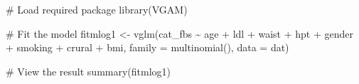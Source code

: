 \documentclass[
  letterpaper,
  DIV=11,
  numbers=noendperiod]{scrartcl}
\newenvironment{Shaded}{\begin{snugshade}}{\end{snugshade}}
\newcommand{\AttributeTok}[1]{\textcolor[rgb]{0.40,0.45,0.13}{#1}}
\newcommand{\CommentTok}[1]{\textcolor[rgb]{0.37,0.37,0.37}{#1}}
\newcommand{\FunctionTok}[1]{\textcolor[rgb]{0.28,0.35,0.67}{#1}}
\newcommand{\NormalTok}[1]{\textcolor[rgb]{0.00,0.23,0.31}{#1}}
\newcommand{\OtherTok}[1]{\textcolor[rgb]{0.00,0.23,0.31}{#1}}
\newcommand{\SpecialCharTok}[1]{\textcolor[rgb]{0.37,0.37,0.37}{#1}}
\begin{document}
\begin{Shaded}
\begin{Highlighting}[]
\CommentTok{\# Load required package}
\FunctionTok{library}\NormalTok{(VGAM)}

\CommentTok{\# Fit the model}
\NormalTok{fitmlog1 }\OtherTok{\textless{}{-}} \FunctionTok{vglm}\NormalTok{(cat\_fbs }\SpecialCharTok{\textasciitilde{}}\NormalTok{ age }\SpecialCharTok{+}\NormalTok{ ldl }\SpecialCharTok{+}\NormalTok{ waist }\SpecialCharTok{+}\NormalTok{ hpt }\SpecialCharTok{+}\NormalTok{ gender }\SpecialCharTok{+}\NormalTok{ smoking }\SpecialCharTok{+}\NormalTok{ crural }\SpecialCharTok{+}\NormalTok{ bmi,}
                 \AttributeTok{family =} \FunctionTok{multinomial}\NormalTok{(),}
                 \AttributeTok{data =}\NormalTok{ dat)}

\CommentTok{\# View the result}
\FunctionTok{summary}\NormalTok{(fitmlog1)}
\end{Highlighting}
\end{Shaded}
\end{document}
